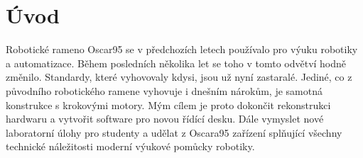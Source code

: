\newpage
\setcounter{page}{5}
\section*{Úvod}
Robotické rameno Oscar95 se v předchozích letech používalo pro výuku robotiky a automatizace. \cite{Oscar95} Během posledních několika let se toho v tomto odvětví hodně změnilo. Standardy, které vyhovovaly kdysi, jsou už nyní zastaralé. Jediné, co z původního robotického ramene vyhovuje i dnešním nárokům, je samotná konstrukce s krokovými motory. Mým cílem je proto dokončit rekonstrukci hardwaru a vytvořit software pro novou řídící desku. Dále vymyslet nové laboratorní úlohy pro studenty a udělat z Oscara95 zařízení splňující všechny technické náležitosti moderní výukové pomůcky robotiky.
\newpage